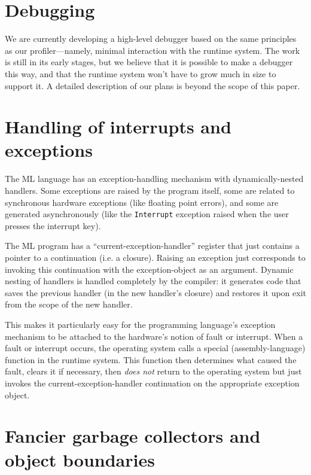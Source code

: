 \section{Debugging}
\label{debugging}

We are currently developing a high-level
debugger based on the same principles as our
profiler---namely, minimal interaction with the runtime system.
The work is still in its early stages, but we believe that
it is possible to make a debugger this way, and that the runtime system
won't have to grow much in size to support it.  A detailed description
of our plans is beyond the scope of this paper.

\section{Handling of interrupts and exceptions}
\label{handling}

The ML language has an exception-handling
 mechanism with dynamically-nested
handlers.  Some exceptions are raised by the program itself, some are related
to synchronous hardware exceptions (like floating point errors), and
some are generated asynchronously (like the \verb"Interrupt" exception
raised when the user presses the interrupt key).

The ML program has a ``current-exception-handler'' register that just
contains a pointer to a continuation
(i.e. a closure).
Raising an exception just
corresponds to invoking this continuation with the exception-object
as an argument.  Dynamic nesting of handlers is handled completely by the
compiler: it generates code that saves the previous handler (in the
new handler's closure) and restores it upon exit from the scope of the
new handler.

This makes it particularly easy for the programming language's exception
mechanism to be attached to the hardware's notion of fault or interrupt.
When a fault or interrupt
occurs, the operating system calls a special
(assembly-language)
function in the runtime system.  This function then determines what
caused the fault, clears it if necessary, then {\em does not} return to the
operating system but just invokes the current-exception-handler continuation
on the appropriate exception object.

\section{Fancier garbage collectors and object boundaries}
\label{fancier}

